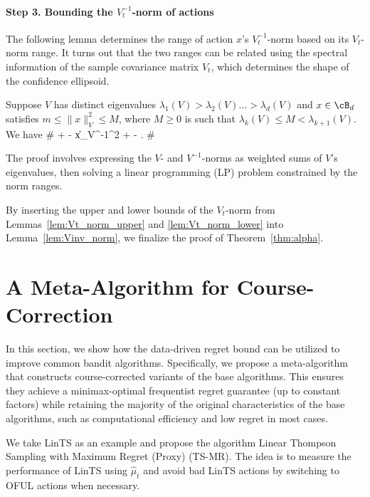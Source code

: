 \paragraph{Step 3. Bounding the $V_t^{-1}$-norm of actions}


The following lemma determines the range of action $x$'s $V_t^{-1}$-norm based on its $V_t$-norm range. It turns out that the two ranges can be related using the spectral information of the sample covariance matrix $V_t$, which determines the shape of the confidence ellipsoid.


\begin{lemma}
\label{lem:Vinv_norm}
	Suppose  $V$ has distinct eigenvalues $\lambda_1( V)> \lambda_2( V) \dots > \lambda_d( V)$
	and $x\in \cB_d$ satisfies
	$
	m \leq \|x\|_{V}^2 \leq M
	$,
	where $M\geq 0$ is such that
	$
		\lambda_{k}(V) \leq M < \lambda_{k+1}(V)
	$. We have
	\#
	 +    -  \leq \|x\|_{V^{-1}}^2  \leq  {} +    - .
	\#
\end{lemma}

The proof involves expressing the $V$- and $V^{-1}$-norms as weighted sums of $V$'s eigenvalues, then solving a linear programming (LP) problem constrained by the norm ranges.




By inserting the upper and lower bounds of the $V_t$-norm from Lemmas~\ref{lem:Vt_norm_upper} and \ref{lem:Vt_norm_lower} into Lemma~\ref{lem:Vinv_norm}, we finalize the proof of Theorem~\ref{thm:alpha}.






\section{A Meta-Algorithm for Course-Correction}
\label{sec:meta}


In this section, we show how the data-driven regret bound can be utilized to improve common bandit algorithms. Specifically, we propose a meta-algorithm that constructs course-corrected variants of the base algorithms. This ensures they achieve a minimax-optimal frequentist regret guarantee (up to constant factors) while retaining the majority of the original characteristics of the base algorithms, such as computational efficiency and low regret in most cases.


We take LinTS as an example and propose the algorithm Linear Thompson Sampling with Maximum Regret (Proxy) (TS-MR). The idea is to measure the performance of LinTS using $\hat{\mu}_t$ and avoid bad LinTS actions by switching to OFUL actions when necessary. 





